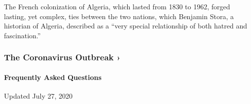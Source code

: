 The French colonization of Algeria, which lasted from 1830 to 1962,
forged lasting, yet complex, ties between the two nations, which
Benjamin Stora, a historian of Algeria, described as a ``very special
relationship of both hatred and fascination.''

\href{https://www.nytimes3xbfgragh.onion/news-event/coronavirus?action=click\&pgtype=Article\&state=default\&region=MAIN_CONTENT_3\&context=storylines_faq}{}

\hypertarget{the-coronavirus-outbreak-}{%
\subsubsection{The Coronavirus Outbreak
›}\label{the-coronavirus-outbreak-}}

\hypertarget{frequently-asked-questions}{%
\paragraph{Frequently Asked
Questions}\label{frequently-asked-questions}}

Updated July 27, 2020


